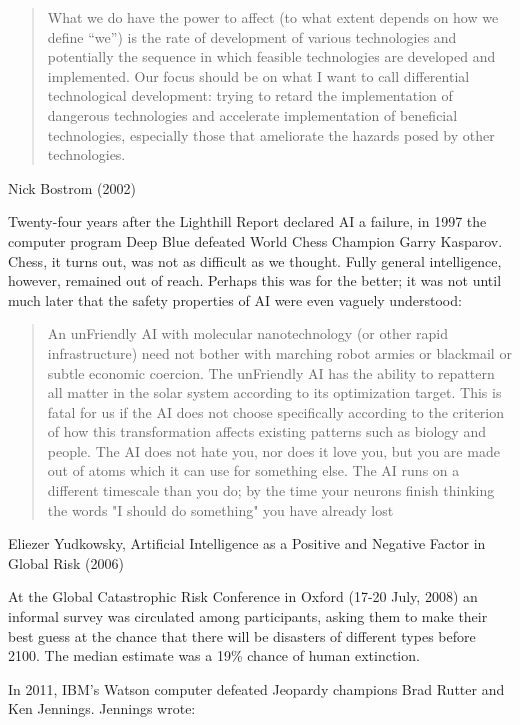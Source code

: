 \documentclass{article}
\begin{document}

\blockquote{What we do have the power to affect (to what extent depends on how
we define ``we'') is the rate of development of various technologies and
potentially the sequence in which feasible technologies are developed and
implemented. Our focus should be on what I want to call differential
technological development: trying to retard the implementation of dangerous
technologies and accelerate implementation of beneficial technologies,
especially those that ameliorate the hazards posed by other
technologies.}{Nick Bostrom (2002)}

\divider

Twenty-four years after the Lighthill Report declared AI a failure, in 1997 the
computer program Deep Blue defeated World Chess Champion Garry Kasparov. Chess,
it turns out, was not as difficult as we thought. Fully general intelligence,
however, remained out of reach. Perhaps this was for the better; it was not
until much later that the safety properties of AI were even vaguely understood:

\divider

\blockquote{An unFriendly AI with molecular nanotechnology (or other rapid
infrastructure) need not bother with marching robot armies or blackmail or
subtle economic coercion. The unFriendly AI has the ability to repattern all
matter in the solar system according to its optimization target. This is fatal
for us if the AI does not choose specifically according to the criterion of how
this transformation affects existing patterns such as biology and people. The
AI does not hate you, nor does it love you, but you are made out of atoms which
it can use for something else. The AI runs on a different timescale than you
do; by the time your neurons finish thinking the words "I should do something"
you have already lost}{Eliezer Yudkowsky, Artificial Intelligence as a Positive
and Negative Factor in Global Risk (2006)}

\divider

At the Global Catastrophic Risk Conference in Oxford (17-20 July, 2008) an
informal survey was circulated among participants, asking them to make their
best guess at the chance that there will be disasters of different types before
2100. The median estimate was a 19\% chance of human extinction.

\divider

In 2011, IBM's Watson computer defeated Jeopardy champions Brad Rutter and Ken
Jennings. Jennings wrote:
\end{document}
